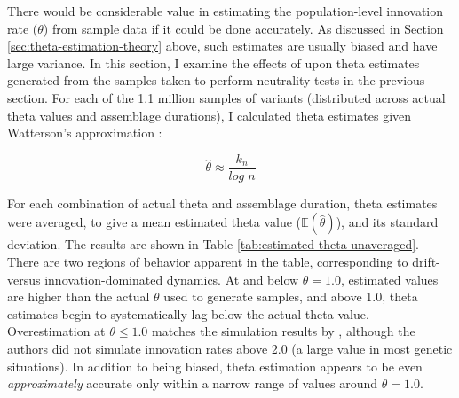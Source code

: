 There would be considerable value in estimating the population-level innovation rate ($\theta$) from sample data if it could be done accurately.  As discussed in Section \ref{sec:theta-estimation-theory} above, such estimates are usually biased and have large variance.  In this section, I examine the effects of \timeav upon theta estimates generated from the samples taken to perform neutrality tests in the previous section.  For each of the 1.1 million samples of variants (distributed across actual theta values and assemblage durations), I calculated theta estimates given Watterson's approximation \citep{durrett2008}:

\begin{equation}
\label{eq:watterson-theta-est}
	\hat{\theta} \approx \frac{k_n}{log\;n}
\end{equation}

For each combination of actual theta and assemblage duration, theta estimates were averaged, to give a mean estimated theta value ($\mathbb{E}(\hat{\theta})$), and its standard deviation.  The results are shown in Table \ref{tab:estimated-theta-unaveraged}.   There are two regions of behavior apparent in the table, corresponding to drift- versus innovation-dominated dynamics.  At and below $\theta = 1.0$, estimated values are higher than the actual $\theta$ used to generate samples, and above 1.0, theta estimates begin to systematically lag below the actual theta value.  Overestimation at $\theta \leq 1.0$ matches the simulation results by \citet{ewens1974note}, although the authors did not simulate innovation rates above 2.0 (a large value in most genetic situations).  In addition to being biased, theta estimation appears to be even \emph{approximately} accurate only within a narrow range of values around $\theta = 1.0$.  

